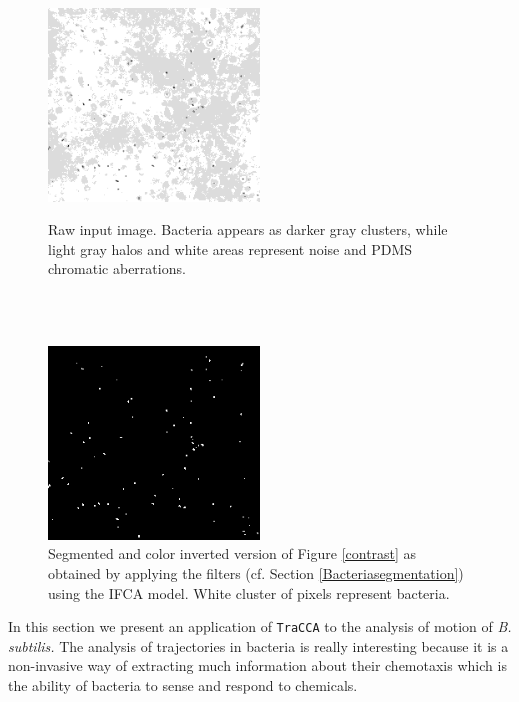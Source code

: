 \begin{figure}
    \begin{minipage}{1.0\textwidth}
        \centering
        \includegraphics[width=0.5\textwidth]{./images/bacteria/bacteriasmall}
        \caption{Raw input image. Bacteria appears as darker gray clusters, while light gray halos and white areas represent noise and PDMS chromatic aberrations.}\label{contrast}
    \end{minipage}
    \hfill \\  \hfill \\
    \begin{minipage}{1.0\textwidth}
        \centering
        \includegraphics[width=0.5\textwidth]{./images/bacteria/bacteriasmall_threshold}
        \caption{Segmented and color inverted version of Figure \ref{contrast} as obtained by applying the filters (cf. Section \ref{Bacteriasegmentation}) using the IFCA model. White cluster of pixels represent bacteria.}\label{BBB}
    \end{minipage}
   
\end{figure}
In this section we present an application of \texttt{TraCCA} to the analysis of motion of \textit{B. subtilis.}
The analysis of trajectories in bacteria is really interesting because it is a non-invasive way of extracting much information about their chemotaxis which is the ability of bacteria to sense and respond to chemicals.
